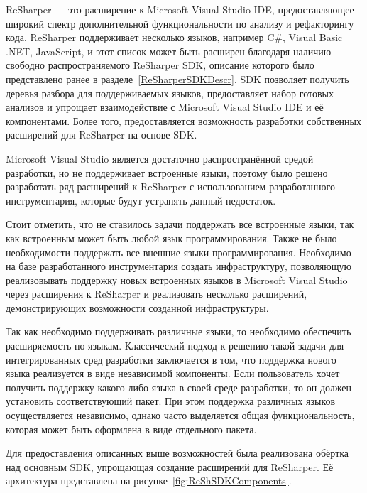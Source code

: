 ReSharper --- это расширение к Microsoft Visual Studio IDE, предоставляющее широкий спектр  дополнительной функциональности по анализу и рефакторингу кода. ReSharper поддерживает несколько языков, например C\#, Visual Basic .NET, JavaScript, и этот список может быть расширен благодаря наличию свободно распространяемого ReSharper SDK, описание которого было представлено ранее в разделе~\ref{ReSharperSDKDescr}. SDK позволяет получить деревья разбора для поддерживаемых языков, предоставляет набор готовых анализов и упрощает взаимодействие с Microsoft Visual Studio IDE и её компонентами. Более того, предоставляется возможность разработки собственных расширений для ReSharper на основе SDK.

Microsoft Visual Studio является достаточно распространённой средой разработки, но не поддерживает встроенные языки, поэтому было решено разработать ряд расширений к ReSharper с использованием разработанного инструментария, которые будут устранять данный недостаток.

Стоит отметить, что не ставилось задачи поддержать все встроенные языки, так как встроенным может быть любой язык программирования. Также не было необходимости поддержать все внешние языки программирования. Необходимо на базе разработанного инструментария создать инфраструктуру, позволяющую реализовывать поддержку новых встроенных языков в Microsoft Visual   Studio через расширения к ReSharper и реализовать несколько расширений, демонстрирующих возможности созданной инфраструктуры. 

Так как необходимо поддерживать различные языки, то необходимо обеспечить расширяемость по языкам. Классический подход к решению такой задачи для интегрированных сред разработки заключается в том, что поддержка нового языка реализуется в виде независимой компоненты. Если пользователь хочет получить поддержку какого-либо языка в своей среде разработки, то он должен установить соответствующий пакет. При этом поддержка различных языков осуществляется независимо, однако часто выделяется общая функциональность, которая может быть оформлена в виде отдельного пакета.

Для предоставления описанных выше возможностей была реализована обёртка над основным SDK, упрощающая создание расширений для ReSharper. Её архитектура представлена на рисунке~\ref{fig:ReShSDKComponents}.

